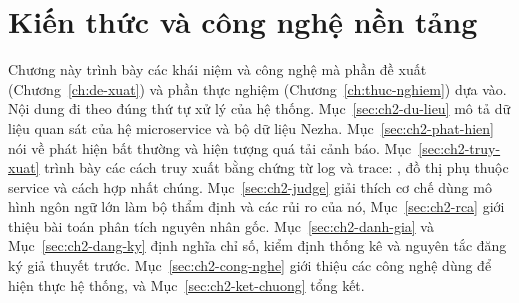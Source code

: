 %        
%        
%        
%        
%

\section{Kiến thức và công nghệ nền tảng}
\label{ch:nen-tang}

Chương này trình bày các khái niệm và công nghệ mà phần đề xuất (Chương~\ref{ch:de-xuat}) và phần thực nghiệm (Chương~\ref{ch:thuc-nghiem}) dựa vào. Nội dung đi theo đúng thứ tự xử lý của hệ thống. Mục~\ref{sec:ch2-du-lieu} mô tả dữ liệu quan sát của hệ microservice và bộ dữ liệu Nezha. Mục~\ref{sec:ch2-phat-hien} nói về phát hiện bất thường và hiện tượng quá tải cảnh báo. Mục~\ref{sec:ch2-truy-xuat} trình bày các cách truy xuất bằng chứng từ log và trace: , đồ thị phụ thuộc service và cách hợp nhất chúng. Mục~\ref{sec:ch2-judge} giải thích cơ chế dùng mô hình ngôn ngữ lớn làm bộ thẩm định và các rủi ro của nó, Mục~\ref{sec:ch2-rca} giới thiệu bài toán phân tích nguyên nhân gốc. Mục~\ref{sec:ch2-danh-gia} và Mục~\ref{sec:ch2-dang-ky} định nghĩa chỉ số, kiểm định thống kê và nguyên tắc đăng ký giả thuyết trước. Mục~\ref{sec:ch2-cong-nghe} giới thiệu các công nghệ dùng để hiện thực hệ thống, và Mục~\ref{sec:ch2-ket-chuong} tổng kết.

